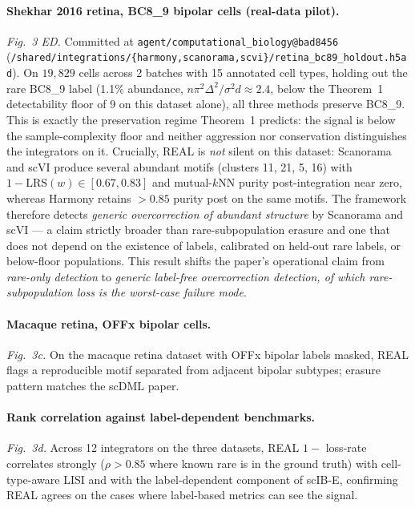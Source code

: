 \paragraph{Shekhar 2016 retina, BC8\_9 bipolar cells (real-data pilot).}  \emph{Fig.~3 ED.}  Committed at \texttt{agent/computational\_biology@bad8456} (\texttt{/shared/integrations/\{harmony,scanorama,scvi\}/retina\_bc89\_holdout.h5ad}).  On $19{,}829$ cells across 2 batches with 15 annotated cell types, holding out the rare BC8\_9 label (1.1\% abundance, $n\pi^2\Delta^2/\sigma^2 d\approx 2.4$, below the Theorem~1 detectability floor of 9 on this dataset alone), all three methods preserve BC8\_9.  This is exactly the preservation regime Theorem~1 predicts: the signal is below the sample-complexity floor and neither aggression nor conservation distinguishes the integrators on it.  Crucially, REAL is \emph{not} silent on this dataset: Scanorama and scVI produce several abundant motifs (clusters 11, 21, 5, 16) with $1 - \mathrm{LRS}(w) \in [0.67, 0.83]$ and mutual-$k$NN purity post-integration near zero, whereas Harmony retains $>\!0.85$ purity post on the same motifs.  The framework therefore detects \emph{generic overcorrection of abundant structure} by Scanorama and scVI — a claim strictly broader than rare-subpopulation erasure and one that does not depend on the existence of labels, calibrated on held-out rare labels, or below-floor populations.  This result shifts the paper's operational claim from \emph{rare-only detection} to \emph{generic label-free overcorrection detection, of which rare-subpopulation loss is the worst-case failure mode}.

\paragraph{Macaque retina, OFFx bipolar cells.} \emph{Fig.~3c.}  On the macaque retina dataset \citep{scDML2023} with OFFx bipolar labels masked, REAL flags a reproducible motif separated from adjacent bipolar subtypes; erasure pattern matches the scDML paper.

\paragraph{Rank correlation against label-dependent benchmarks.} \emph{Fig.~3d.}  Across 12 integrators on the three datasets, REAL $1-$ loss-rate correlates strongly ($\rho > 0.85$ where known rare is in the ground truth) with cell-type-aware LISI and with the label-dependent component of scIB-E, confirming REAL agrees on the cases where label-based metrics can see the signal.

